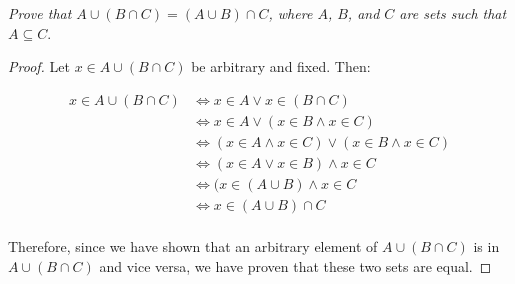 \documentclass[11pt,largemargins]{homework}
\begin{document}
\maketitle

\question

\textit{Prove that \(A \cup (B \cap C) = (A \cup B) \cap C\), where \(A\),
\(B\), and \(C\) are sets such that \(A \subseteq C\)}.

\begin{proof}
  Let \(x \in A \cup (B \cap C)\) be arbitrary and fixed. Then:

  \begin{align*}
    x \in A \cup (B \cap C) &\iff x \in A \vee x \in (B \cap C)                          \tag{Definition of \(\cup\)} \\
                            &\iff x \in A \vee (x \in B \wedge x \in C)                  \tag{Definition of \(\cap\)} \\
                            &\iff (x \in A \wedge x \in C) \vee (x \in B \wedge x \in C) \tag{\(A \subseteq C\)} \\
                            &\iff (x \in A \vee x \in B) \wedge x \in C                  \tag{Distributivity} \\
                            &\iff (x \in (A \cup B) \wedge x \in C                       \tag{Definition of \(\cup\)} \\
                            &\iff x \in (A \cup B) \cap C                                \tag{Definition of \(\cap\)} \\
  \end{align*}

  Therefore, since we have shown that an arbitrary element of \(A \cup (B \cap
  C)\) is in \(A \cup (B \cap C)\) and vice versa, we have proven that these two
  sets are equal.
\end{proof}
\end{document}
